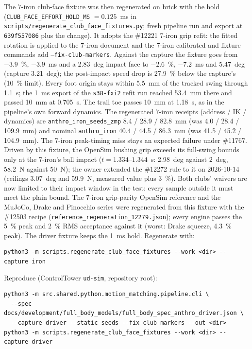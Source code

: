 \documentclass[11pt,a4paper]{article}
\begin{document}
The 7-iron club-face fixture was then regenerated on brick with the hold
(\texttt{CLUB\_FACE\_EFFORT\_HOLD\_MS} $= 0.125$~ms in
\texttt{scripts/regenerate\_club\_face\_fixtures.py}; fresh pipeline run and
export at \texttt{639f557086} plus the change). It adopts the \#12221 7-iron grip
refit: the fitted rotation is applied to the 7-iron document and the 7-iron
calibrated and fixture commands add \texttt{--fix-club-markers}. Against the
capture the fixture goes from $-3.9$~\%, $-3.9$~ms and a 2.83~deg impact face to
$-2.6$~\%, $-7.2$~ms and 5.47~deg (capture 3.21~deg); the post-impact speed drop
is 27.9~\% below the capture's (10~\% limit). Every foot origin stays within
5.5~mm of the tracked swing through 1.1~s; the 1~ms export of the
\texttt{s38-fxi2} refit run reached 53.4~mm there and passed 10~mm at 0.705~s.
The trail toe passes 10~mm at 1.18~s, as in the pipeline's own forward dynamics.
The regenerated 7-iron receipts (address / IK / dynamics) are
\texttt{anthro\_iron\_seeds\_zmp} 8.4 / 28.9 / 82.8~mm (was 4.0 / 28.4 /
109.9~mm) and nominal \texttt{anthro\_iron} 40.4 / 44.5 / 86.3~mm (was 41.5 /
45.2 / 104.9~mm). The 7-iron peak-timing miss stays an expected failure under
\#11767. Driven by this fixture, the OpenSim bushing grip exceeds its full-swing
bounds only at the 7-iron's ball impact ($t = 1.334$--$1.344$~s: 2.98~deg against
2~deg, 58.2~N against 50~N); the owner extended the \#12272 rule to it on
2026-10-14 (ceilings 3.07~deg and 59.9~N, measured value plus 3~\%). Both clubs'
waivers are now limited to their impact window in the test: every sample outside
it must meet the plain bound. The 7-iron grip-parity OpenSim reference and the MuJoCo, Drake and
Pinocchio series were regenerated from this fixture with the \#12503 recipe
(\texttt{reference\_regeneration\_12279.json}); every engine passes the 5~\% peak and
2~\% RMS acceptance against it (worst: Drake squeeze, 4.3~\% peak). The driver fixture keeps the 1~ms hold. Regenerate with:
\begin{verbatim}
python3 -m scripts.regenerate_club_face_fixtures --work <dir> --capture iron
\end{verbatim}

Reproduce (ControlTower \texttt{ud-sim}, repository root):
\begin{verbatim}
python3 -m src.shared.python.motion_matching.pipeline.cli \
  --spec docs/development/full_body_models/full_body_spec_anthro_driver.json \
  --capture driver --static-seeds --fix-club-markers --out <dir>
python3 -m scripts.regenerate_club_face_fixtures --work <dir> --capture driver
\end{verbatim}
\end{document}
